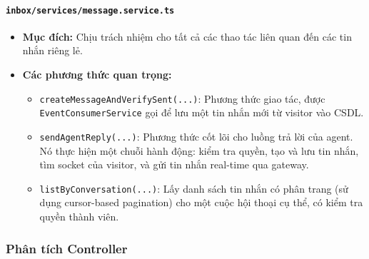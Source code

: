 \paragraph{\texttt{inbox/services/message.service.ts}}
\begin{itemize}
    \item \textbf{Mục đích:} Chịu trách nhiệm cho tất cả các thao tác liên quan đến các tin nhắn riêng lẻ.
    \item \textbf{Các phương thức quan trọng:}
    \begin{itemize}
        \item \texttt{createMessageAndVerifySent(...)}: Phương thức giao tác, được \texttt{EventConsumerService} gọi để lưu một tin nhắn mới từ visitor vào CSDL.
        \item \texttt{sendAgentReply(...)}: Phương thức cốt lõi cho luồng trả lời của agent. Nó thực hiện một chuỗi hành động: kiểm tra quyền, tạo và lưu tin nhắn, tìm socket của visitor, và gửi tin nhắn real-time qua gateway.
        \item \texttt{listByConversation(...)}: Lấy danh sách tin nhắn có phân trang (sử dụng cursor-based pagination) cho một cuộc hội thoại cụ thể, có kiểm tra quyền thành viên.
    \end{itemize}
\end{itemize}


\subsubsection{Phân tích Controller}
\label{subsubsec:inbox-controller}

